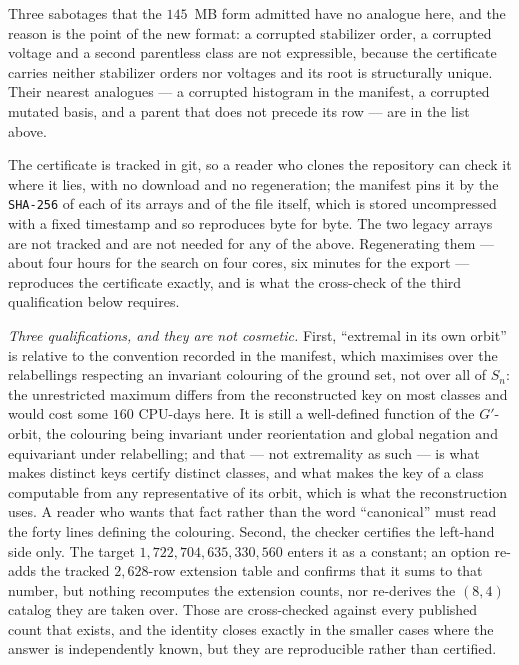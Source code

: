 \documentclass[11pt]{amsart}
\theoremstyle{remark}
\begin{document}
Three sabotages that the $145$~MB form admitted have no analogue here, and
the reason is the point of the new format: a corrupted stabilizer order, a
corrupted voltage and a second parentless class are not expressible,
because the certificate carries neither stabilizer orders nor voltages and
its root is structurally unique. Their nearest analogues --- a corrupted
histogram in the manifest, a corrupted mutated basis, and a parent that
does not precede its row --- are in the list above.

The certificate is tracked in git, so a reader who clones the repository
can check it where it lies, with no download and no regeneration; the
manifest pins it by the \texttt{SHA-256} of each of its arrays and of the
file itself, which is stored uncompressed with a fixed timestamp and so
reproduces byte for byte. The two legacy arrays are not tracked and are
not needed for any of the above. Regenerating them --- about four hours
for the search on four cores, six minutes for the export --- reproduces
the certificate exactly, and is what the cross-check of the third
qualification below requires.

\emph{Three qualifications, and they are not cosmetic.} First, ``extremal
in its own orbit'' is relative to the convention recorded in the manifest,
which maximises over the relabellings respecting an invariant colouring of
the ground set, not over all of $S_n$: the unrestricted maximum differs
from the reconstructed key on most classes and would cost some $160$
CPU-days here. It is still a well-defined function of the $G'$-orbit, the
colouring being invariant under reorientation and global negation and
equivariant under relabelling; and that --- not extremality as such --- is
what makes distinct keys certify distinct classes, and what makes the key
of a class computable from any representative of its orbit, which is what
the reconstruction uses. A reader who wants that fact rather than the word
``canonical'' must read the forty lines defining the
colouring. Second, the checker certifies the
left-hand side only. The target $1{,}722{,}704{,}635{,}330{,}560$ enters it
as a constant; an option re-adds the tracked $2{,}628$-row extension table
and confirms that it sums to that number, but nothing recomputes the
extension counts, nor re-derives the $(8,4)$ catalog they are taken over.
Those are cross-checked against every published count that exists, and the
identity closes exactly in the smaller cases where the answer is
independently known, but they are reproducible rather than certified.
\end{document}

